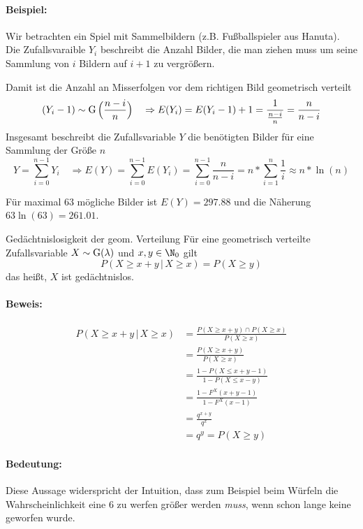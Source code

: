 \paragraph{Beispiel:}
Wir betrachten ein Spiel mit Sammelbildern (z.B. Fußballspieler aus Hanuta). Die Zufallsvaraible $Y_i$ beschreibt die Anzahl Bilder, die man ziehen muss um seine Sammlung von $i$ Bildern auf $i+1$ zu vergrößern.

Damit ist die Anzahl an Misserfolgen vor dem richtigen Bild geometrisch verteilt
\begin{equation*}
	(Y_i-1)\sim \operatorname{G}\Big(\frac{n-i}{n}\Big)\quad\Rightarrow E(Y_i)=E(Y_i-1)+1=\frac{1}{\frac{n-i}{n}}=\frac{n}{n-i}
\end{equation*}
Insgesamt beschreibt die Zufallsvariable $Y$ die benötigten Bilder für eine Sammlung der Größe $n$
\begin{equation*}
	Y=\sum_{i=0}^{n-1} Y_i\quad\Rightarrow E(Y)=\sum_{i=0}^{n-1} E(Y_i)=\sum_{i=0}^{n-1} \frac{n}{n-i}=n*\sum_{i=1}^{n}\frac1i\approx n*\ln(n)
\end{equation*}

Für maximal $63$ mögliche Bilder ist $E(Y)=297.88$ und die Näherung $63\ln(63)=261.01$.


\begin{satz}{Gedächtnislosigkeit der geom. Verteilung}
	Für eine geometrisch verteilte Zufallsvariable $X\sim \operatorname{G}(\lambda)$ und $x,y\in\N_0$ gilt
	\begin{equation*}
		P(X\geq x+y\,|\,X\geq x)=P(X\geq y)
	\end{equation*}
	das heißt, $X$ ist gedächtnislos.
\end{satz}
\paragraph{Beweis:}
\begin{align*}
	P(X\geq x+y\,|\,X\geq x)&=\frac{P(X\geq x+y)\cap P(X\geq x)}{P(X\geq x)}\\
	&=\frac{P(X\geq x+y)}{P(X\geq x)}\\
	&=\frac{1-P(X\leq x+y-1)}{1-P(X\leq x-y)}\\
	&=\frac{1-F^X(x+y-1)}{1-F^X(x-1)}\\
	&=\frac{q^{x+y}}{q^x}\\
	&=q^y=P(X\geq y)
\end{align*}

\paragraph{Bedeutung:}
Diese Aussage widerspricht der Intuition, dass zum Beispiel beim Würfeln die Wahrscheinlichkeit eine $6$ zu werfen größer werden \emph{muss}, wenn schon lange keine geworfen wurde.
